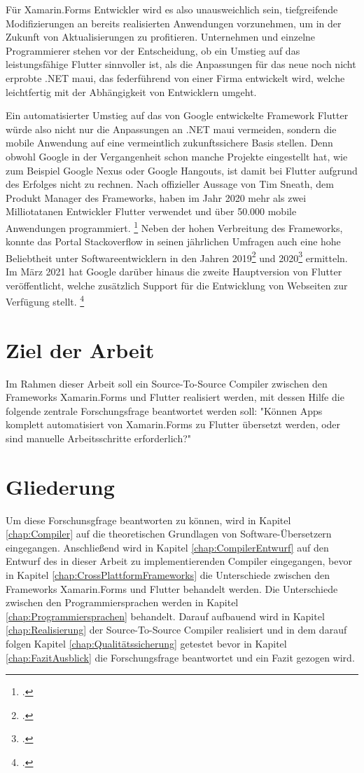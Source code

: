 Für Xamarin.Forms Entwickler wird es also unausweichlich sein,  tiefgreifende Modifizierungen an bereits realisierten Anwendungen vorzunehmen,  um in der Zukunft von Aktualisierungen zu profitieren.  Unternehmen und einzelne Programmierer stehen vor der Entscheidung,  ob ein Umstieg auf das leistungsfähige Flutter sinnvoller ist,  als die Anpassungen für das neue noch nicht erprobte .NET \ac{maui},  das federführend von einer Firma entwickelt wird,  welche leichtfertig mit der Abhängigkeit von Entwicklern umgeht.

Ein automatisierter Umstieg auf das von Google entwickelte Framework Flutter würde also nicht nur die Anpassungen an .NET \ac{maui} vermeiden,  sondern die mobile Anwendung auf eine vermeintlich zukunftssichere Basis stellen.  Denn obwohl Google in der Vergangenheit schon manche Projekte eingestellt hat,  wie zum Beispiel Google Nexus oder Google Hangouts,  ist damit bei Flutter aufgrund des Erfolges nicht zu rechnen.  Nach offizieller Aussage von Tim Sneath, dem Produkt Manager des Frameworks,  haben im Jahr 2020 mehr als zwei Milliotatanen Entwickler Flutter verwendet und über 50.000 mobile Anwendungen programmiert. \footcite[Vgl.][Abgerufen am 28.10.2020]{Sneath2020} Neben der hohen Verbreitung des Frameworks,  konnte das Portal Stackoverflow in seinen jährlichen Umfragen auch eine hohe Beliebtheit unter Softwareentwicklern in den Jahren 2019\footcite[Vgl.][Abgerufen am 28.10.2020]{Stack2019} und 2020\footcite[Vgl.][Abgerufen am 28.10.2020]{Stack2020} ermitteln.  Im März 2021 hat Google darüber hinaus die zweite Hauptversion von Flutter veröffentlicht,  welche zusätzlich Support für die Entwicklung von Webseiten zur Verfügung stellt. \footcite[Vgl.][Abgerufen am 28.10.2020]{GoogleFlutter2}


\section{Ziel der Arbeit}
Im Rahmen dieser Arbeit soll ein Source-To-Source Compiler zwischen den Frameworks Xamarin.Forms und Flutter realisiert werden, mit dessen Hilfe die folgende zentrale Forschungsfrage beantwortet werden soll: "Können Apps komplett automatisiert von Xamarin.Forms zu Flutter übersetzt werden, oder sind manuelle Arbeitsschritte erforderlich?"

\section{Gliederung}
Um diese Forschunsgfrage beantworten zu können, wird in Kapitel \ref{chap:Compiler} auf die theoretischen Grundlagen von Software-Übersetzern eingegangen.  Anschließend wird in Kapitel \ref{chap:CompilerEntwurf} auf den Entwurf des in dieser Arbeit zu implementierenden Compiler eingegangen, bevor in Kapitel \ref{chap:CrossPlattformFrameworks} die Unterschiede zwischen den Frameworks Xamarin.Forms und Flutter behandelt werden.  Die Unterschiede zwischen den Programmiersprachen werden in Kapitel \ref{chap:Programmiersprachen} behandelt. Darauf aufbauend wird in Kapitel \ref{chap:Realisierung} der Source-To-Source Compiler realisiert und in dem darauf folgen Kapitel \ref{chap:Qualitätssicherung} getestet bevor in Kapitel \ref{chap:FazitAusblick} die Forschungsfrage beantwortet und ein Fazit gezogen wird. 